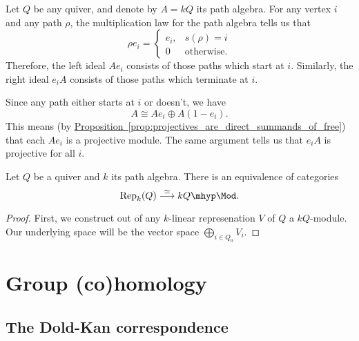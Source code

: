 \documentclass[main.tex]{subfiles}
\begin{document}
\begin{example}
  \label{eg:left_ideals_of_path_algebra_are_projective}
  Let $Q$ be any quiver, and denote by $A = kQ$ its path algebra. For any vertex $i$ and any path $\rho$, the multiplication law for the path algebra tells us that
  \begin{equation*}
    \rho e_{i} =
    \begin{cases}
      e_{i}, & s(\rho) = i \\
      0 & \text{otherwise}.
    \end{cases}
  \end{equation*}
  Therefore, the left ideal $A e_{i}$ consists of those paths which start at $i$. Similarly, the right ideal $e_{i} A$ consists of those paths which terminate at $i$.

  Since any path either starts at $i$ or doesn't, we have
  \begin{equation*}
    A \cong Ae_{i} \oplus A(1 - e_{i}).
  \end{equation*}
  This means (by \hyperref[prop:projectives_are_direct_summands_of_free]{Proposition~\ref*{prop:projectives_are_direct_summands_of_free}}) that each $Ae_{i}$ is a projective module. The same argument tells us that $e_{i}A$ is projective for all $i$.
\end{example}

\begin{proposition}
  Let $Q$ be a quiver and $k$ its path algebra. There is an equivalence of categories
  \begin{equation*}
    \mathrm{Rep}_{k}(Q) \overset{\simeq}{\longrightarrow} kQ\mhyp\Mod.
  \end{equation*}
\end{proposition}
\begin{proof}
  First, we construct out of any $k$-linear represenation $V$ of $Q$ a $kQ$-module. Our underlying space will be the vector space $\bigoplus_{i \in Q_{0}} V_{i}$.
\end{proof}

\section{Group (co)homology}
\label{sec:group_co_homology}

\subsection{The Dold-Kan correspondence}
\label{ssc:the_dold_kan_correspondence}
\end{document}

